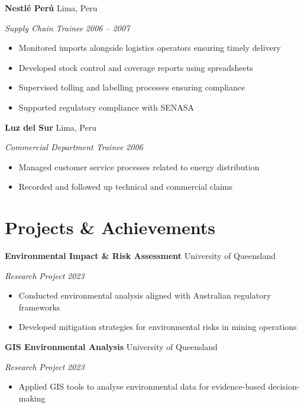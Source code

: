 \documentclass[11pt,letterpaper]{article}
\newcommand{\entry}[4]{%
  \noindent\textbf{#1} \hfill #2 \par\nopagebreak
  \textit{#3} \hfill \textit{#4} \par\nopagebreak
}
\begin{document}
\entry{Nestl\'e Per\'u}{Lima, Peru}{Supply Chain Trainee}{2006 -- 2007}
\begin{itemize}
  \item Monitored imports alongside logistics operators ensuring timely delivery
  \item Developed stock control and coverage reports using spreadsheets
  \item Supervised tolling and labelling processes ensuring compliance
  \item Supported regulatory compliance with SENASA
\end{itemize}
\vspace{0.3em}

\entry{Luz del Sur}{Lima, Peru}{Commercial Department Trainee}{2006}
\begin{itemize}
  \item Managed customer service processes related to energy distribution
  \item Recorded and followed up technical and commercial claims
\end{itemize}
\vspace{0.3em}

\section{Projects \& Achievements}

\entry{Environmental Impact \& Risk Assessment}{University of Queensland}{Research Project}{2023}
\begin{itemize}
  \item Conducted environmental analysis aligned with Australian regulatory frameworks
  \item Developed mitigation strategies for environmental risks in mining operations
\end{itemize}
\vspace{0.3em}

\entry{GIS Environmental Analysis}{University of Queensland}{Research Project}{2023}
\begin{itemize}
  \item Applied GIS tools to analyse environmental data for evidence-based decision-making
\end{itemize}
\vspace{0.3em}

\end{document}
